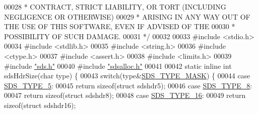 \begin{DoxyCode}
00028 \textcolor{comment}{ * CONTRACT, STRICT LIABILITY, OR TORT (INCLUDING NEGLIGENCE OR OTHERWISE)}
00029 \textcolor{comment}{ * ARISING IN ANY WAY OUT OF THE USE OF THIS SOFTWARE, EVEN IF ADVISED OF THE}
00030 \textcolor{comment}{ * POSSIBILITY OF SUCH DAMAGE.}
00031 \textcolor{comment}{ */}
00032 
00033 \textcolor{preprocessor}{#}\textcolor{preprocessor}{include} \textcolor{preprocessor}{<}\textcolor{preprocessor}{stdio}\textcolor{preprocessor}{.}\textcolor{preprocessor}{h}\textcolor{preprocessor}{>}
00034 \textcolor{preprocessor}{#}\textcolor{preprocessor}{include} \textcolor{preprocessor}{<}\textcolor{preprocessor}{stdlib}\textcolor{preprocessor}{.}\textcolor{preprocessor}{h}\textcolor{preprocessor}{>}
00035 \textcolor{preprocessor}{#}\textcolor{preprocessor}{include} \textcolor{preprocessor}{<}\textcolor{preprocessor}{string}\textcolor{preprocessor}{.}\textcolor{preprocessor}{h}\textcolor{preprocessor}{>}
00036 \textcolor{preprocessor}{#}\textcolor{preprocessor}{include} \textcolor{preprocessor}{<}\textcolor{preprocessor}{ctype}\textcolor{preprocessor}{.}\textcolor{preprocessor}{h}\textcolor{preprocessor}{>}
00037 \textcolor{preprocessor}{#}\textcolor{preprocessor}{include} \textcolor{preprocessor}{<}\textcolor{preprocessor}{assert}\textcolor{preprocessor}{.}\textcolor{preprocessor}{h}\textcolor{preprocessor}{>}
00038 \textcolor{preprocessor}{#}\textcolor{preprocessor}{include} \textcolor{preprocessor}{<}\textcolor{preprocessor}{limits}\textcolor{preprocessor}{.}\textcolor{preprocessor}{h}\textcolor{preprocessor}{>}
00039 \textcolor{preprocessor}{#}\textcolor{preprocessor}{include} \hyperlink{sds_8h}{"sds.h"}
00040 \textcolor{preprocessor}{#}\textcolor{preprocessor}{include} \hyperlink{sdsalloc_8h}{"sdsalloc.h"}
00041 
00042 \textcolor{keyword}{static} \textcolor{keyword}{inline} \textcolor{keywordtype}{int} sdsHdrSize(\textcolor{keywordtype}{char} type) \{
00043     \textcolor{keywordflow}{switch}(type&\hyperlink{sds_8h_a07564783f389fdd7772a8f61d55d9ddf}{SDS\_TYPE\_MASK}) \{
00044         \textcolor{keywordflow}{case} \hyperlink{sds_8h_a3b7b67f1efa75f6b78ae18ea853b1a91}{SDS\_TYPE\_5}:
00045             \textcolor{keywordflow}{return} \textcolor{keyword}{sizeof}(\textcolor{keyword}{struct} sdshdr5);
00046         \textcolor{keywordflow}{case} \hyperlink{sds_8h_a504136356f04bfa2fd616dd4c8fdd71c}{SDS\_TYPE\_8}:
00047             \textcolor{keywordflow}{return} \textcolor{keyword}{sizeof}(\textcolor{keyword}{struct} sdshdr8);
00048         \textcolor{keywordflow}{case} \hyperlink{sds_8h_aa54044bf70a30824caeb1bab3615bff2}{SDS\_TYPE\_16}:
00049             \textcolor{keywordflow}{return} \textcolor{keyword}{sizeof}(\textcolor{keyword}{struct} sdshdr16);

\end{DoxyCode}
